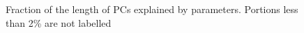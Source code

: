\begin{figure}[h]
    \begin{center}
    \end{center}

    \caption[Fraction of the length of PCs explained by parameters]{Fraction of the length of PCs explained by parameters. Portions less than 2\% are not labelled}
    \label{fig:pc_pie}
\end{figure}

